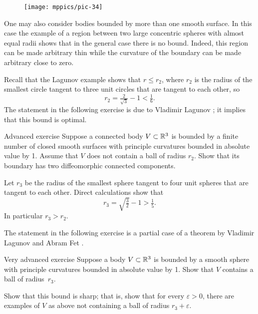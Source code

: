 \begin{wrapfigure}{o}{25 mm}
\vskip-0mm
\centering
\texttt{[image: mppics/pic-34]}
\vskip0mm
\end{wrapfigure}

One may also consider bodies bounded by more than one smooth surface.
In this case the example of a region between two large concentric spheres with almost equal radii shows that in the general case there is no bound.
Indeed, this region can be made arbitrary thin while the curvature of the boundary can be made arbitrary close to zero.

Recall that the Lagunov example shows that $r\le r_2$,
where $r_2$ is the radius of the smallest circle tangent to three unit circles that are tangent to each other,
so 
\[r_2=\tfrac2{\sqrt{3}}-1< \tfrac16.\]
The statement in the following exercise is due to Vladimir Lagunov \cite{lagunov-1960};
it implies that this bound is optimal.

\begin{thm}{Advanced exercise}\label{ex:thin}
Suppose a connected body $V\subset \mathbb{R}^3$ is bounded by a finite number of closed smooth surfaces with principle curvatures bounded in absolute value by 1.
Assume that $V$ does not contain a ball of radius $r_2$.
Show that its boundary has two diffeomorphic  connected components. 
\end{thm}


Let $r_3$
be the radius of the smallest sphere tangent to four unit spheres that are tangent to each other.
Direct calculations show that 
\[r_3=\sqrt{\tfrac32}-1>\tfrac15.\]
In particular $r_3>r_2$.

The statement in the following exercise is a partial case of a theorem by Vladimir Lagunov and Abram Fet \cite{lagunov-fet-1963, lagunov-fet-1965}.

\begin{thm}{Very advanced exercise}\label{ex:PI-sphere}
Suppose a body $V\subset \mathbb{R}^3$ is bounded by a smooth sphere with principle curvatures bounded in absolute value by 1.
Show that $V$ contains a ball of radius~$r_3$.

Show that this bound is sharp; that is, show that for every $\varepsilon >0$, there are examples of $V$ as above not containing a ball of radius $r_3+ \varepsilon$.
\end{thm}




